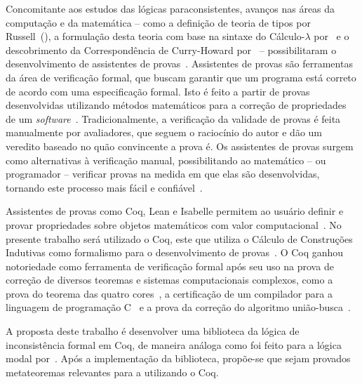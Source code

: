 Concomitante aos estudos das lógicas paraconsistentes, avanços nas áreas da computação e da matemática {--} como a definição de teoria de tipos por Russell~(\citeyear{russell1903principles,Russell1908-RUSMLA}), a formulação desta teoria com base na sintaxe do Cálculo-$\lambda$ por~ e o descobrimento da Correspondência de Curry-Howard por~ {--} possibilitaram o desenvolvimento de assistentes de provas~\cite{harrison2014history}. Assistentes de provas são ferramentas da área de verificação formal, que buscam garantir que um programa está correto de acordo com uma especificação formal. Isto é feito a partir de provas desenvolvidas utilizando métodos matemáticos para a correção de propriedades de um \textit{software}~\cite{Chlipala_2013}. Tradicionalmente, a verificação da validade de provas é feita manualmente por avaliadores, que seguem o raciocínio do autor e dão um veredito baseado no quão convincente a prova é. Os assistentes de provas surgem como alternativas à verificação manual, possibilitando ao matemático {--} ou programador {--} verificar provas na medida em que elas são desenvolvidas, tornando este processo mais fácil e confiável~\cite{paulinmohring:hal-01094195}.

Assistentes de provas como Coq, Lean e Isabelle permitem ao usuário definir e provar propriedades sobre objetos matemáticos com valor computacional~\cite{geuvers2009proof}. No presente trabalho será utilizado o Coq, este que utiliza o Cálculo de Construções Indutivas como formalismo para o desenvolvimento de provas~\cite{TEAM_2024}. O Coq ganhou notoriedade como ferramenta de verificação formal após seu uso na prova de correção de diversos teoremas e sistemas computacionais complexos, como a prova do teorema das quatro cores~\cite{geuvers2009proof}, a certificação de um compilador para a linguagem de programação C~\cite{leroy2021compcert} e a prova da correção do algoritmo união-busca~\cite{union-find}.

A proposta deste trabalho é desenvolver uma biblioteca da lógica de inconsistência formal \lfium{} em Coq, de maneira análoga como foi feito para a lógica modal por~. Após a implementação da biblioteca, propõe-se que sejam provados metateoremas relevantes para a \lfium{} utilizando o Coq.



